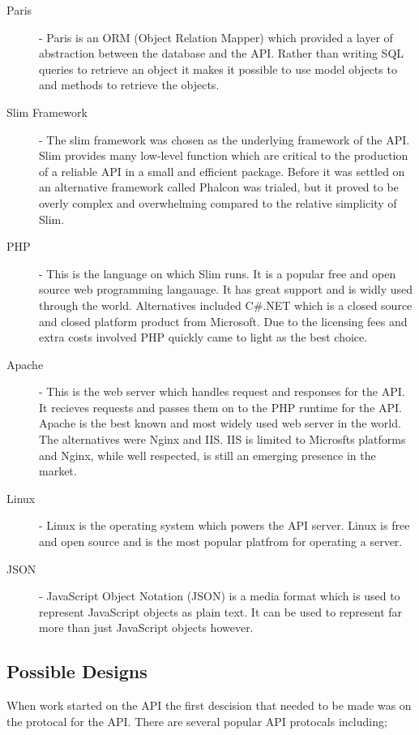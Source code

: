 \documentclass[11pt,a4paper]{report}
\begin{document}
\begin{description}
\item[Paris] - Paris is an ORM (Object Relation Mapper) which provided a layer of abstraction between the database and the API. Rather than writing SQL queries to retrieve an object it makes it possible to use model objects to and methods to retrieve the objects.  
\item[Slim Framework] - The slim framework was chosen as the underlying framework of the API. Slim provides many low-level function which are critical to the production of a reliable API in a small and efficient package. Before it was settled on an alternative framework called Phalcon was trialed, but it proved to be overly complex and overwhelming compared to the relative simplicity of Slim. 
\item[PHP] - This is the language on which Slim runs. It is a popular free and open source web programming langauage. It has great support and is widly used through the world. Alternatives included C\#.NET which is a closed source and closed platform product from Microsoft. Due to the licensing fees and extra costs involved PHP quickly came to light as the best choice. 
\item[Apache] - This is the web server which handles request and responses for the API. It recieves requests and passes them on to the PHP runtime for the API. Apache is the best known and most widely used web server in the world. The alternatives were Nginx and IIS. IIS is limited to Microsfts platforms and Nginx, while well respected, is still an emerging presence in the market. 
\item[Linux] - Linux is the operating system which powers the API server. Linux is free and open source and is the most popular platfrom for operating a server.
\item[JSON] - JavaScript Object Notation (JSON) is a media format which is used to represent JavaScript objects as plain text. It can be used to represent far more than just JavaScript objects however. 
\end{description}

\subsection{Possible Designs}
\label{sec:api:rejected-designs} %
When work started on the API the first descision that needed to be made was on the protocal for the API. There are several popular API protocals including;
\end{document}
